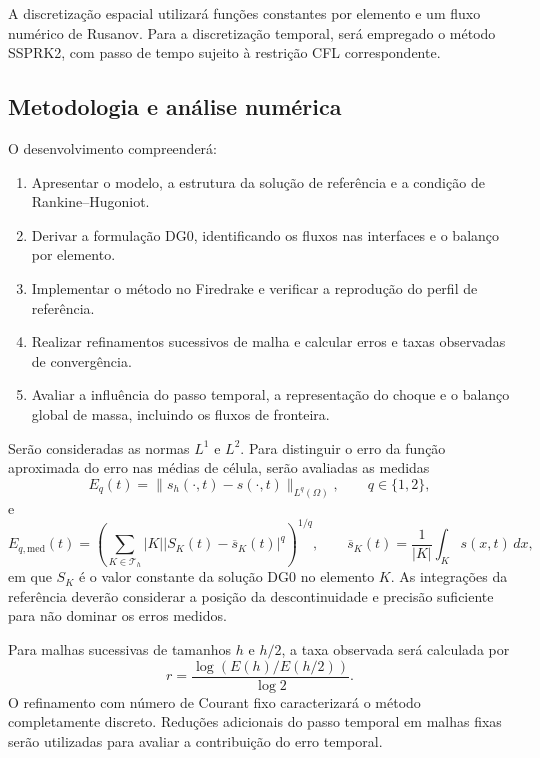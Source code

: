 \documentclass[11pt,a4paper]{article}
\begin{document}
A discretização espacial utilizará funções constantes por elemento e um fluxo numérico de Rusanov. Para a discretização temporal, será empregado o método SSPRK2, com passo de tempo sujeito à restrição CFL correspondente.

\subsection{Metodologia e análise numérica}

O desenvolvimento compreenderá:
\begin{enumerate}
    \item Apresentar o modelo, a estrutura da solução de referência e a condição de Rankine--Hugoniot.
    \item Derivar a formulação DG0, identificando os fluxos nas interfaces e o balanço por elemento.
    \item Implementar o método no Firedrake e verificar a reprodução do perfil de referência.
    \item Realizar refinamentos sucessivos de malha e calcular erros e taxas observadas de convergência.
    \item Avaliar a influência do passo temporal, a representação do choque e o balanço global de massa, incluindo os fluxos de fronteira.
\end{enumerate}

Serão consideradas as normas $L^1$ e $L^2$. Para distinguir o erro da função aproximada do erro nas médias de célula, serão avaliadas as medidas
\begin{equation}
    E_q(t)=\|s_h(\cdot,t)-s(\cdot,t)\|_{L^q(\Omega)},
    \qquad q\in\{1,2\},
\end{equation}
e
\begin{equation}
    E_{q,\mathrm{med}}(t)
    =
    \left(
    \sum_{K\in\mathcal{T}_h}|K|
    |S_K(t)-\overline{s}_K(t)|^q
    \right)^{1/q},
    \qquad
    \overline{s}_K(t)=\frac{1}{|K|}\int_K s(x,t)\,dx,
\end{equation}
em que $S_K$ é o valor constante da solução DG0 no elemento $K$. As integrações da referência deverão considerar a posição da descontinuidade e precisão suficiente para não dominar os erros medidos.

Para malhas sucessivas de tamanhos $h$ e $h/2$, a taxa observada será calculada por
\begin{equation}
    r=\frac{\log(E(h)/E(h/2))}{\log 2}.
\end{equation}
O refinamento com número de Courant fixo caracterizará o método completamente discreto. Reduções adicionais do passo temporal em malhas fixas serão utilizadas para avaliar a contribuição do erro temporal.
\end{document}
